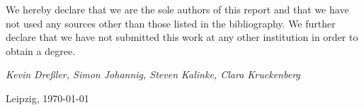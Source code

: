 
We hereby declare that we are the sole authors of this report and that we have not used any sources other than those listed in the bibliography. We further declare that we have not submitted this work at any other institution in order to obtain a degree.

\begin{flushright}
\textit{Kevin Dreßler, Simon Johannig, Steven Kalinke, Clara Kruckenberg}

Leipzig, \today{}
\end{flushright}





